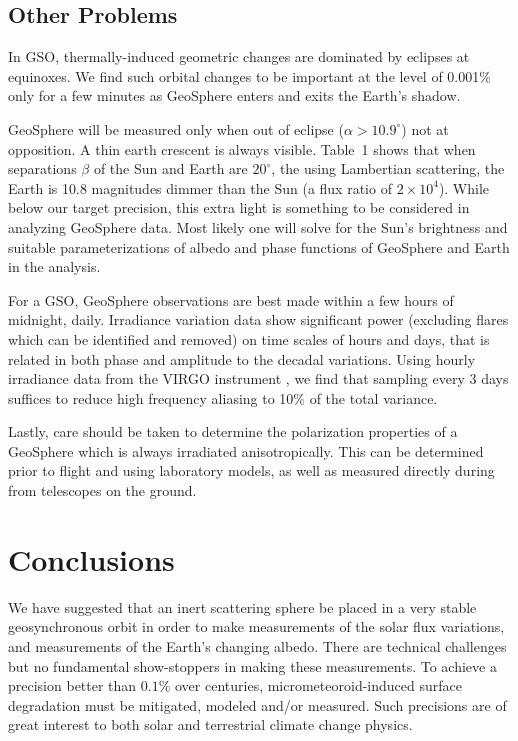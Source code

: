 \documentclass[useAMS,usenatbib]{mn2e}
\newcommand\name{LAMBERT}
\renewcommand\name{GeoSphere}
\begin{document}
\subsection{Other Problems}

In GSO, thermally-induced geometric changes are dominated by
eclipses at equinoxes.  We find such 
orbital changes to be important at the level of 0.001\% only
for a few minutes as \name{} enters and exits the Earth's shadow.

\name{} will be measured only when out of eclipse ($\alpha > 10.9^\circ$) not
at opposition.  A thin earth crescent is always visible.  
Table~1 shows that when separations $\beta$ of the 
Sun and Earth are $20^\circ$, the 
using Lambertian scattering, the Earth is 10.8 magnitudes dimmer than the Sun
(a flux ratio of $2\times10^4$).  While below our target precision, this extra light 
is something to be considered in analyzing \name{} data.  Most likely one will solve for
the Sun's brightness and suitable parameterizations of albedo and phase functions 
of \name{} and Earth in the analysis.


For a GSO, \name{} observations are best made within a
few hours of midnight, daily.  Irradiance variation data show significant
power (excluding flares which can be identified and removed)
on time scales of hours and days, that is related in both phase and 
amplitude to the decadal variations.  
Using hourly irradiance data from the VIRGO 
instrument \citep{Virgo1997}, we find that sampling every 3 days 
suffices to reduce high frequency aliasing to 10\% of the total variance. 

Lastly, care should be taken to determine the polarization properties of
a \name{} which is always irradiated anisotropically.   This can be determined 
prior to flight and using laboratory models, as well as measured directly 
during from telescopes on the ground.  

\section{Conclusions}

We have suggested that an inert scattering sphere be placed in a
very stable geosynchronous orbit in order to make measurements of the solar flux
variations, and measurements of the Earth's changing albedo.  There
are technical challenges but no fundamental show-stoppers 
in making these measurements. To achieve a
precision better than $0.1$\% 
over centuries, micrometeoroid-induced surface degradation must
be mitigated, modeled and/or measured.  Such precisions are of
great interest to both solar and terrestrial climate change physics.
\end{document}
